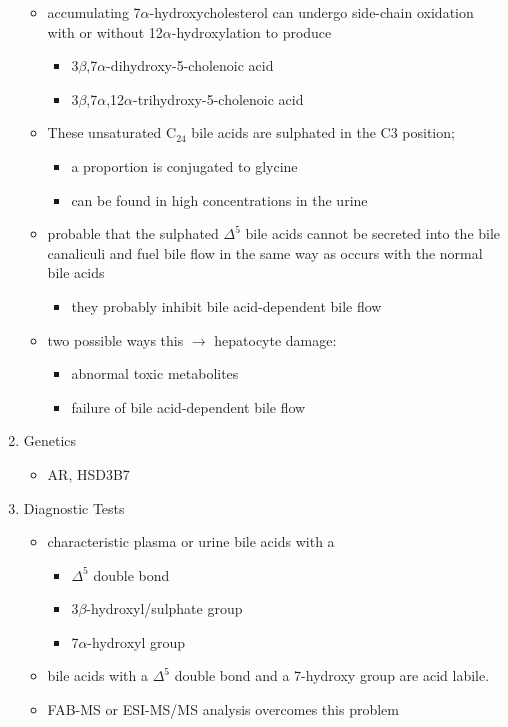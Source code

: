 \documentclass{scrartcl}
\begin{document}
\begin{enumerate}
\begin{itemize}
\item accumulating 7\(\alpha\)-hydroxycholesterol can undergo side-chain
oxidation with or without 12\(\alpha\)-hydroxylation to produce
\begin{itemize}
\item 3\(\beta\),7\(\alpha\)-dihydroxy-5-cholenoic acid
\item 3\(\beta\),7\(\alpha\),12\(\alpha\)-trihydroxy-5-cholenoic acid
\end{itemize}
\item These unsaturated C\(_{\text{24}}\) bile acids are sulphated in the C3 position;
\begin{itemize}
\item a proportion is conjugated to glycine
\item can be found in high concentrations in the urine
\end{itemize}
\item probable that the sulphated \(\Delta^{\text{5}}\) bile acids cannot be secreted
into the bile canaliculi and fuel bile flow in the same way as
occurs with the normal bile acids
\begin{itemize}
\item they probably inhibit bile acid-dependent bile flow
\end{itemize}
\item two possible ways this \(\to\) hepatocyte damage:
\begin{itemize}
\item abnormal toxic metabolites
\item failure of bile acid-dependent bile flow
\end{itemize}
\end{itemize}

\item Genetics
\label{sec:orgc2eeb4c}
\begin{itemize}
\item AR, HSD3B7
\end{itemize}

\item Diagnostic Tests
\label{sec:org23918ad}
\begin{itemize}
\item characteristic plasma or urine bile acids with a
\begin{itemize}
\item \(\Delta^{\text{5}}\) double bond
\item 3\(\beta\)-hydroxyl/sulphate group
\item 7\(\alpha\)-hydroxyl group
\end{itemize}
\item bile acids with a \(\Delta^{\text{5}}\) double bond and a 7-hydroxy group are acid labile.
\item FAB-MS or ESI-MS/MS analysis overcomes this problem
\end{itemize}


\end{enumerate}
\end{document}
